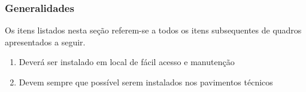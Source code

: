 \subsubsection{Generalidades}

Os itens listados nesta seção referem-se a todos os itens subsequentes de quadros apresentados a seguir.

\begin{enumerate}
	\item Deverá ser instalado em local de fácil acesso e manutenção
	\item Devem sempre que possível serem instalados nos pavimentos técnicos
\end{enumerate}